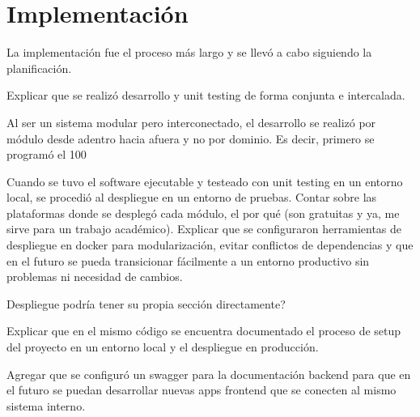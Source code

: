 \chapter[Implementación]{Implementación}
\label{cp:implementation}

\parindent0pt

La implementación fue el proceso más largo y se llevó a cabo siguiendo la planificación.

Explicar que se realizó desarrollo y unit testing de forma conjunta e intercalada.

Al ser un sistema modular pero interconectado, el desarrollo se realizó por módulo desde adentro hacia afuera y no por dominio. Es decir, primero se programó el 100%

Cuando se tuvo el software ejecutable y testeado con unit testing en un entorno local, se procedió al despliegue en un entorno de pruebas. Contar sobre las plataformas donde se desplegó cada módulo, el por qué (son gratuitas y ya, me sirve para un trabajo académico). Explicar que se configuraron herramientas de despliegue en docker para modularización, evitar conflictos de dependencias y que en el futuro se pueda transicionar fácilmente a un entorno productivo sin problemas ni necesidad de cambios.

Despliegue podría tener su propia sección directamente?

Explicar que en el mismo código se encuentra documentado el proceso de setup del proyecto en un entorno local y el despliegue en producción.

Agregar que se configuró un swagger para la documentación backend para que en el futuro se puedan desarrollar nuevas apps frontend que se conecten al mismo sistema interno. 
